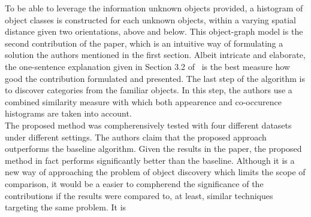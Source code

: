 \documentclass[11pt]{article}
\begin{document}
To be able to leverage the information unknown objects provided, a histogram of object classes is constructed for each unknown objects, within a varying spatial distance given two orientations, above and below.
This object-graph model is the second contribution of the paper, which is an intuitive way of formulating a solution the authors mentioned in the first section.
Albeit intricate and elaborate, the one-sentence explanation given in Section 3.2 of~\cite{lee2012object} is the best measure how good the contribution formulated and presented.
The last step of the algorithm is to discover categories from the familiar objects.
In this step, the authors use a combined similarity measure with which both appearence and co-occurence histograms are taken into account.\\
\indent The proposed method was compherensively tested with four different datasets under different settings.
The authors claim that the proposed approach outperforms the baseline algorithm.
Given the results in the paper, the proposed method in fact performs significantly better than the baseline.
Although it is a new way of approaching the problem of object discovery which limits the scope of comparison, it would be a easier to compherend the significance of the contributions if the results were compared to, at least, similar techniques targeting the same problem.
It is 


\end{document}
